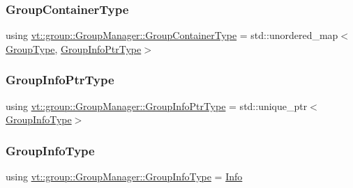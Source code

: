 \mbox{\label{structvt_1_1group_1_1_group_manager_a9e2a0989865f4097bb5edd390865555e}} 
\subsubsection{\texorpdfstring{Group\+Container\+Type}{GroupContainerType}}
{\footnotesize\ttfamily using \hyperlink{structvt_1_1group_1_1_group_manager_a9e2a0989865f4097bb5edd390865555e}{vt\+::group\+::\+Group\+Manager\+::\+Group\+Container\+Type} =  std\+::unordered\+\_\+map$<$\hyperlink{namespacevt_a27b5e4411c9b6140c49100e050e2f743}{Group\+Type}, \hyperlink{structvt_1_1group_1_1_group_manager_adedebd6e550efd2bee5bb118f816b2e0}{Group\+Info\+Ptr\+Type}$>$}

\mbox{\label{structvt_1_1group_1_1_group_manager_adedebd6e550efd2bee5bb118f816b2e0}} 
\subsubsection{\texorpdfstring{Group\+Info\+Ptr\+Type}{GroupInfoPtrType}}
{\footnotesize\ttfamily using \hyperlink{structvt_1_1group_1_1_group_manager_adedebd6e550efd2bee5bb118f816b2e0}{vt\+::group\+::\+Group\+Manager\+::\+Group\+Info\+Ptr\+Type} =  std\+::unique\+\_\+ptr$<$\hyperlink{structvt_1_1group_1_1_group_manager_a556f65e569f3e3f2dfc4a247e137b409}{Group\+Info\+Type}$>$}

\mbox{\label{structvt_1_1group_1_1_group_manager_a556f65e569f3e3f2dfc4a247e137b409}} 
\subsubsection{\texorpdfstring{Group\+Info\+Type}{GroupInfoType}}
{\footnotesize\ttfamily using \hyperlink{structvt_1_1group_1_1_group_manager_a556f65e569f3e3f2dfc4a247e137b409}{vt\+::group\+::\+Group\+Manager\+::\+Group\+Info\+Type} =  \hyperlink{structvt_1_1group_1_1_info}{Info}}

